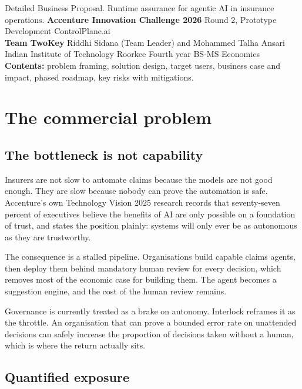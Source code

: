 \documentclass[10pt]{article}
\begin{document}
{Detailed Business Proposal. Runtime assurance for agentic AI in insurance operations.}
{\textbf{Accenture Innovation Challenge 2026} \quad Round 2, Prototype Development \quad ControlPlane.ai\\[3pt]
\textbf{Team TwoKey} \quad Riddhi Sidana (Team Leader) and Mohammed Talha Ansari\\[3pt]
Indian Institute of Technology Roorkee \quad Fourth year BS-MS Economics}
{\textbf{Contents:} problem framing, solution design, target users, business case and impact, phased roadmap, key risks with mitigations.}

\section{The commercial problem}

\subsection{The bottleneck is not capability}

Insurers are not slow to automate claims because the models are not good enough. They are
slow because nobody can prove the automation is safe. Accenture's own Technology Vision
2025 research records that seventy-seven percent of executives believe the benefits of AI
are only possible on a foundation of trust, and states the position plainly: systems will
only ever be as autonomous as they are trustworthy.

The consequence is a stalled pipeline. Organisations build capable claims agents, then
deploy them behind mandatory human review for every decision, which removes most of the
economic case for building them. The agent becomes a suggestion engine, and the cost of
the human review remains.

\begin{callout}
Governance is currently treated as a brake on autonomy. Interlock reframes it as the
throttle. An organisation that can prove a bounded error rate on unattended decisions can
safely increase the proportion of decisions taken without a human, which is where the
return actually sits.
\end{callout}

\subsection{Quantified exposure}
\end{document}
